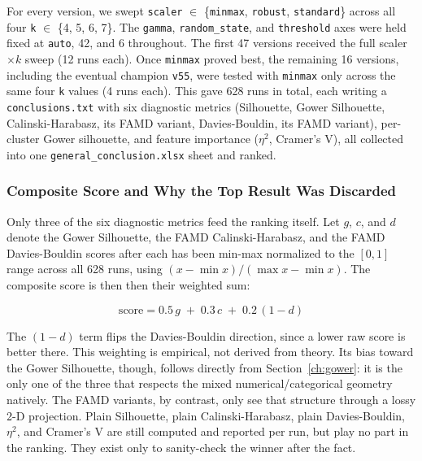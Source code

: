 For every version, we swept \texttt{scaler} $\in$ \{\texttt{minmax}, \texttt{robust}, \texttt{standard}\}
  across all four \texttt{k} $\in$ \{4, 5, 6, 7\}. The \texttt{gamma}, \texttt{random\_state}, and
  \texttt{threshold} axes were held fixed at \texttt{auto}, 42, and 6 throughout. The first 47
  versions received the full scaler$\times k$ sweep (12 runs each). Once \texttt{minmax}
  proved best, the remaining 16 versions, including the eventual champion \texttt{v55}, were
  tested with \texttt{minmax} only across the same four \texttt{k} values (4 runs each). This
  gave 628 runs in total, each writing a \texttt{conclusions.txt} with six diagnostic metrics
  (Silhouette, Gower Silhouette, Calinski-Harabasz, its FAMD variant, Davies-Bouldin, its FAMD
  variant), per-cluster Gower silhouette, and feature importance ($\eta^2$, Cramer's V), all
  collected into one \texttt{general\_conclusion.xlsx} sheet and ranked.

\subsubsection*{Composite Score and Why the Top Result Was Discarded}
\label{ch:composite_score}

Only three of the six diagnostic metrics feed the ranking itself. Let $g$, $c$, and $d$ denote the Gower Silhouette, the FAMD Calinski-Harabasz, and the FAMD Davies-Bouldin scores after each has been min-max normalized to the $[0,1]$ range across all 628 runs, using $(x - \min x)/(\max x - \min x)$. The composite score is then then their weighted sum:

\begin{equation}
    \mathrm{score} = 0.5\,g \;+\; 0.3\,c \;+\; 0.2\,(1 - d)
    \label{eq:composite_score}
\end{equation}

\noindent The $(1 - d)$ term flips the Davies-Bouldin direction, since a lower raw score is better there. This weighting is empirical, not derived from theory. Its bias toward the Gower Silhouette, though, follows directly from Section~\ref{ch:gower}: it is the only one of the three that respects the mixed numerical/categorical geometry natively. The FAMD variants, by contrast, only see that structure through a lossy 2-D projection. Plain Silhouette, plain Calinski-Harabasz, plain Davies-Bouldin, $\eta^2$, and Cramer's V are still computed and reported per run, but play no part in the ranking. They exist only to sanity-check the winner after the fact.

